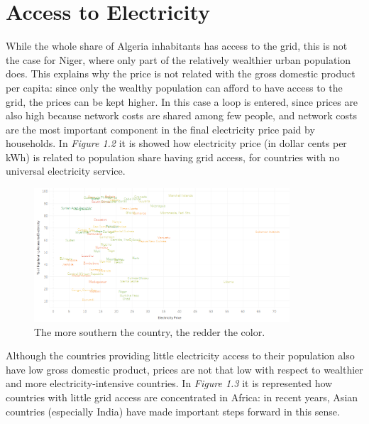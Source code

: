 \documentclass{book}
\begin{document}
\section{Access to Electricity}

While the whole share of Algeria inhabitants has access to the grid, this is not the case for Niger, where only part of the relatively wealthier urban population does. This explains why the price is not related with the gross domestic product per capita: since only the wealthy population can afford to have access to the grid, the prices can be kept higher. In this case a loop is entered, since prices are also high because network costs are shared among few people, and network costs are the most important component in the final electricity price paid by households. In \textit{Figure 1.2} it is showed how electricity price (in dollar cents per kWh) is related to population share having grid access, for countries with no universal electricity service.

\bigskip
\begin{figure}[H]
\begin{center}
\captionsetup{justification=centering}
\includegraphics[width=0.85\textwidth]{Images/accessNAMES.png}
\caption{The more southern the country, the redder the color. }
\end{center}
\end{figure}
\bigskip

Although the countries providing little electricity access to their population also have low gross domestic product, prices are not that low with respect to wealthier and more electricity-intensive countries. In \textit{Figure 1.3} it is represented how countries with little grid access are concentrated in Africa: in recent years, Asian countries (especially India) have made important steps forward in this sense.
\end{document}
